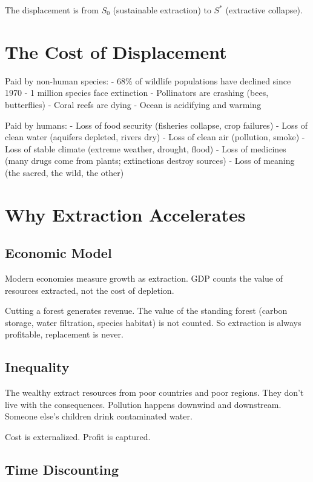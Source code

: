 \documentclass[12pt]{article}
\begin{document}
The displacement is from $S_0$ (sustainable extraction) to $S^*$ (extractive collapse).

\section{The Cost of Displacement}

Paid by non-human species:
- 68\% of wildlife populations have declined since 1970
- 1 million species face extinction
- Pollinators are crashing (bees, butterflies)
- Coral reefs are dying
- Ocean is acidifying and warming

Paid by humans:
- Loss of food security (fisheries collapse, crop failures)
- Loss of clean water (aquifers depleted, rivers dry)
- Loss of clean air (pollution, smoke)
- Loss of stable climate (extreme weather, drought, flood)
- Loss of medicines (many drugs come from plants; extinctions destroy sources)
- Loss of meaning (the sacred, the wild, the other)

\section{Why Extraction Accelerates}

\subsection{Economic Model}

Modern economies measure growth as extraction. GDP counts the value of resources extracted, not the cost of depletion.

Cutting a forest generates revenue. The value of the standing forest (carbon storage, water filtration, species habitat) is not counted. So extraction is always profitable, replacement is never.

\subsection{Inequality}

The wealthy extract resources from poor countries and poor regions. They don't live with the consequences. Pollution happens downwind and downstream. Someone else's children drink contaminated water.

Cost is externalized. Profit is captured.

\subsection{Time Discounting}
\end{document}
